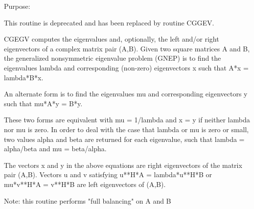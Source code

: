  \begin{DoxyParagraph}{Purpose\+: }
\begin{DoxyVerb} This routine is deprecated and has been replaced by routine CGGEV.

 CGEGV computes the eigenvalues and, optionally, the left and/or right
 eigenvectors of a complex matrix pair (A,B).
 Given two square matrices A and B,
 the generalized nonsymmetric eigenvalue problem (GNEP) is to find the
 eigenvalues lambda and corresponding (non-zero) eigenvectors x such
 that
    A*x = lambda*B*x.

 An alternate form is to find the eigenvalues mu and corresponding
 eigenvectors y such that
    mu*A*y = B*y.

 These two forms are equivalent with mu = 1/lambda and x = y if
 neither lambda nor mu is zero.  In order to deal with the case that
 lambda or mu is zero or small, two values alpha and beta are returned
 for each eigenvalue, such that lambda = alpha/beta and
 mu = beta/alpha.
 
 The vectors x and y in the above equations are right eigenvectors of
 the matrix pair (A,B).  Vectors u and v satisfying
    u**H*A = lambda*u**H*B  or  mu*v**H*A = v**H*B
 are left eigenvectors of (A,B).

 Note: this routine performs "full balancing" on A and B\end{DoxyVerb}
 
\end{DoxyParagraph}


